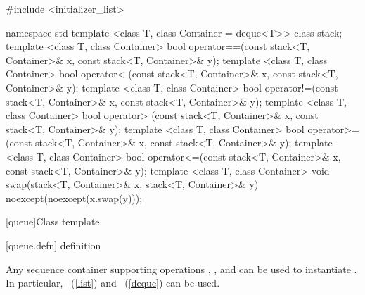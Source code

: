 \begin{codeblock}
#include <initializer_list>

namespace std {
  template <class T, class Container = deque<T>> class stack;
  template <class T, class Container>
    bool operator==(const stack<T, Container>& x, const stack<T, Container>& y);
  template <class T, class Container>
    bool operator< (const stack<T, Container>& x, const stack<T, Container>& y);
  template <class T, class Container>
    bool operator!=(const stack<T, Container>& x, const stack<T, Container>& y);
  template <class T, class Container>
    bool operator> (const stack<T, Container>& x, const stack<T, Container>& y);
  template <class T, class Container>
    bool operator>=(const stack<T, Container>& x, const stack<T, Container>& y);
  template <class T, class Container>
    bool operator<=(const stack<T, Container>& x, const stack<T, Container>& y);
  template <class T, class Container>
    void swap(stack<T, Container>& x, stack<T, Container>& y) noexcept(noexcept(x.swap(y)));
}
\end{codeblock}

[queue]{Class template }

[queue.defn]{ definition}

\pnum
{}%
Any sequence container supporting operations
,
,
and
can be used to instantiate
.
In particular,
~(\ref{list})
and
~(\ref{deque})
can be used.

